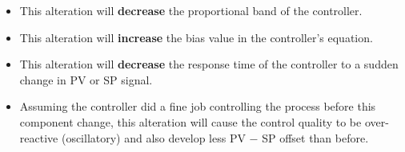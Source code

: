 





\begin{itemize}
\item{} This alteration will {\bf decrease} the proportional band of the controller.
\vskip 10pt
\item{} This alteration will {\bf increase} the bias value in the controller's equation.
\vskip 10pt
\item{} This alteration will {\bf decrease} the response time of the controller to a sudden change in PV or SP signal.
\vskip 10pt
\item{} Assuming the controller did a fine job controlling the process before this component change, this alteration will cause the control quality to be over-reactive (oscillatory) and also develop less PV $-$ SP offset than before.
\end{itemize}












